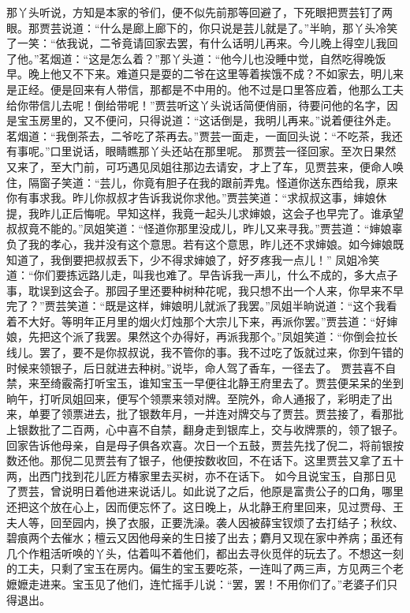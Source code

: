 \documentclass[12pt,oneside]{book}
\begin{document}
那丫头听说，方知是本家的爷们，便不似先前那等回避了，下死眼把贾芸钉了两眼。那贾芸说道：“什么是廊上廊下的，你只说是芸儿就是了。”半晌，那丫头冷笑了一笑：“依我说，二爷竟请回家去罢，有什么话明儿再来。今儿晚上得空儿我回了他。”茗烟道：“这是怎么着？”那丫头道：“他今儿也没睡中觉，自然吃得晚饭早。晚上他又不下来。难道只是耍的二爷在这里等着挨饿不成？不如家去，明儿来是正经。便是回来有人带信，那都是不中用的。他不过是口里答应着，他那么工夫给你带信儿去呢！倒给带呢！”贾芸听这丫头说话简便俏丽，待要问他的名字，因是宝玉房里的，又不便问，只得说道：“这话倒是，我明儿再来。”说着便往外走。茗烟道：“我倒茶去，二爷吃了茶再去。”贾芸一面走，一面回头说：“不吃茶，我还有事呢。”口里说话，眼睛瞧那丫头还站在那里呢。
那贾芸一径回家。至次日果然又来了，至大门前，可巧遇见凤姐往那边去请安，才上了车，见贾芸来，便命人唤住，隔窗子笑道：“芸儿，你竟有胆子在我的跟前弄鬼。怪道你送东西给我，原来你有事求我。昨儿你叔叔才告诉我说你求他。”贾芸笑道：“求叔叔这事，婶娘休提，我昨儿正后悔呢。早知这样，我竟一起头儿求婶娘，这会子也早完了。谁承望叔叔竟不能的。”凤姐笑道：“怪道你那里没成儿，昨儿又来寻我。”贾芸道：“婶娘辜负了我的孝心，我并没有这个意思。若有这个意思，昨儿还不求婶娘。如今婶娘既知道了，我倒要把叔叔丢下，少不得求婶娘了，好歹疼我一点儿！”
凤姐冷笑道：“你们要拣远路儿走，叫我也难了。早告诉我一声儿，什么不成的，多大点子事，耽误到这会子。那园子里还要种树种花呢，我只想不出一个人来，你早来不早完了？”贾芸笑道：“既是这样，婶娘明儿就派了我罢。”凤姐半晌说道：“这个我看着不大好。等明年正月里的烟火灯烛那个大宗儿下来，再派你罢。”贾芸道：“好婶娘，先把这个派了我罢。果然这个办得好，再派我那个。”凤姐笑道：“你倒会拉长线儿。罢了，要不是你叔叔说，我不管你的事。我不过吃了饭就过来，你到午错的时候来领银子，后日就进去种树。”说毕，命人驾了香车，一径去了。
贾芸喜不自禁，来至绮霰斋打听宝玉，谁知宝玉一早便往北静王府里去了。贾芸便呆呆的坐到晌午，打听凤姐回来，便写个领票来领对牌。至院外，命人通报了，彩明走了出来，单要了领票进去，批了银数年月，一并连对牌交与了贾芸。贾芸接了，看那批上银数批了二百两，心中喜不自禁，翻身走到银库上，交与收牌票的，领了银子。回家告诉他母亲，自是母子俱各欢喜。次日一个五鼓，贾芸先找了倪二，将前银按数还他。那倪二见贾芸有了银子，他便按数收回，不在话下。这里贾芸又拿了五十两，出西门找到花儿匠方椿家里去买树，亦不在话下。
如今且说宝玉，自那日见了贾芸，曾说明日着他进来说话儿。如此说了之后，他原是富贵公子的口角，哪里还把这个放在心上，因而便忘怀了。这日晚上，从北静王府里回来，见过贾母、王夫人等，回至园内，换了衣服，正要洗澡。袭人因被薛宝钗烦了去打结子；秋纹、碧痕两个去催水；檀云又因他母亲的生日接了出去；麝月又现在家中养病；虽还有几个作粗活听唤的丫头，估着叫不着他们，都出去寻伙觅伴的玩去了。不想这一刻的工夫，只剩了宝玉在房内。偏生的宝玉要吃茶，一连叫了两三声，方见两三个老嬷嬷走进来。宝玉见了他们，连忙摇手儿说：“罢，罢！不用你们了。”老婆子们只得退出。
\end{document}
